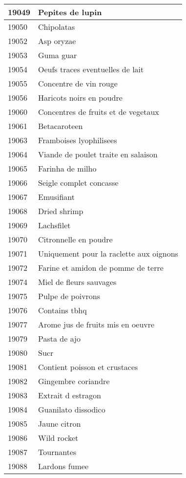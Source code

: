 \begin{longtable}{|l|l|}
19049 & Pepites de lupin \\ \hline 
19050 & Chipolatas \\ \hline 
19052 & Asp oryzae \\ \hline 
19053 & Guma guar \\ \hline 
19054 & Oeufs traces eventuelles de lait \\ \hline 
19055 & Concentre de vin rouge \\ \hline 
19056 & Haricots noirs en poudre \\ \hline 
19060 & Concentres de fruits et de vegetaux \\ \hline 
19061 & Betacaroteen \\ \hline 
19063 & Framboises lyophilisees \\ \hline 
19064 & Viande de poulet traite en salaison \\ \hline 
19065 & Farinha de milho \\ \hline 
19066 & Seigle complet concasse \\ \hline 
19067 & Emusifiant \\ \hline 
19068 & Dried shrimp \\ \hline 
19069 & Lachsfilet \\ \hline 
19070 & Citronnelle en poudre \\ \hline 
19071 & Uniquement pour la raclette aux oignons \\ \hline 
19072 & Farine et amidon de pomme de terre \\ \hline 
19074 & Miel de fleurs sauvages \\ \hline 
19075 & Pulpe de poivrons \\ \hline 
19076 & Contains tbhq \\ \hline 
19077 & Arome jus de fruits mis en oeuvre \\ \hline 
19079 & Pasta de ajo \\ \hline 
19080 & Sucr \\ \hline 
19081 & Contient poisson et crustaces \\ \hline 
19082 & Gingembre coriandre \\ \hline 
19083 & Extrait d estragon \\ \hline 
19084 & Guanilato dissodico \\ \hline 
19085 & Jaune citron \\ \hline 
19086 & Wild rocket \\ \hline 
19087 & Tournantes \\ \hline 
19088 & Lardons fumee \\ \hline 

\end{longtable}
